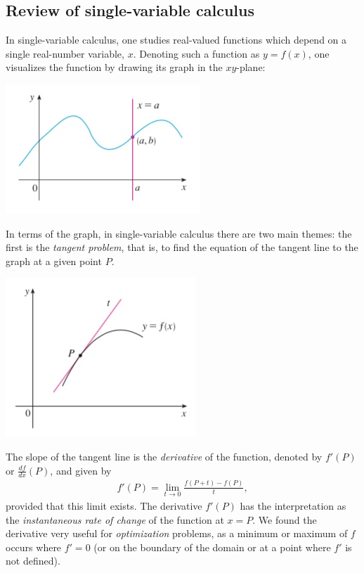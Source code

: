 \documentclass[12pt,letterpaper,reqno]{article}
\numberwithin{equation}{section}
\newcommand{\ti}[1]{\textit{#1}}
\begin{document}
\subsection{Review of single-variable calculus}
In single-variable calculus, one studies real-valued functions which depend on a single real-number variable, $x$. Denoting such a function as $y=f(x)$, one visualizes the function by drawing its graph in the $xy$-plane:
\begin{center}
	\includegraphics[scale=0.5]{figures_mvc/graph_of_a_function}
\end{center}
In terms of the graph, in single-variable calculus there are two main themes: the first is the \ti{tangent problem}, that is, to find the equation of the tangent line to the graph at a given point $P$.
\begin{center}
	\includegraphics[scale=0.5]{figures_mvc/tangent_line_at_P}
\end{center}
The slope of the tangent line is the \ti{derivative} of the function, denoted by $f'(P)$ or $\frac{df}{dx}(P)$, and given by
\begin{align*}
	f'(P)=\lim_{t \to 0}\frac{f(P+t)-f(P)}{t},
\end{align*}
provided that this limit exists. The derivative $f'(P)$ has the interpretation as the \ti{instantaneous rate of change} of the function at $x=P$. We found the derivative very useful for \ti{optimization} problems, as a minimum or maximum of $f$ occurs where $f'=0$ (or on the boundary of the domain or at a point where $f'$ is not defined).
\end{document}
